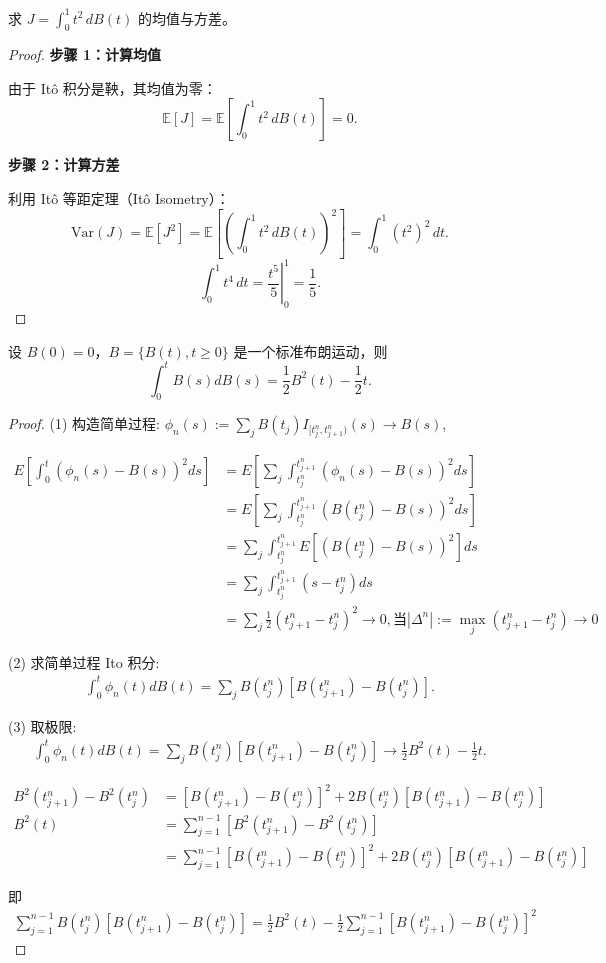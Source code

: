 \documentclass[lang=cn,10pt,thmcnt=section]{elegantbook}
\begin{document}
\begin{example}
	求 \( J = \int_{0}^{1} t^2 \, dB(t) \) 的均值与方差。
\end{example}
\begin{proof}
	\textbf{步骤 1：计算均值}  

由于 Itô 积分是鞅，其均值为零：
\[
\mathbb{E}[J] = \mathbb{E}\left[\int_{0}^{1} t^2 \, dB(t)\right] = 0.
\]

\textbf{步骤 2：计算方差}  

利用 Itô 等距定理（Itô Isometry）：
\[
\text{Var}(J) = \mathbb{E}[J^2] = \mathbb{E}\left[\left(\int_{0}^{1} t^2 \, dB(t)\right)^2\right] = \int_{0}^{1} (t^2)^2 \, dt.
\]
\[
\int_{0}^{1} t^4 \, dt = \left. \frac{t^5}{5} \right|_{0}^{1} = \frac{1}{5}.
\]
\end{proof}
\begin{example}
	设 \( B(0) = 0 \)，\( B = \{B(t), t \geq 0\} \) 是一个标准布朗运动，则
\[
\int_0^t B(s) dB(s) = \frac{1}{2} B^2(t) - \frac{1}{2} t.
\]
\end{example}
\begin{proof}
    (1) 构造简单过程: \(\phi_n(s) := \sum_j B(t_j) I_{[t_j^n, t_{j+1}^n)}(s) \rightarrow B(s)\),

    \begin{align*}
    E\left[\int_0^t (\phi_n(s) - B(s))^2 ds\right] &= E\left[\sum_j \int_{t_j^n}^{t_{j+1}^n} (\phi_n(s) - B(s))^2 ds\right] \\
    &= E\left[\sum_j \int_{t_j^n}^{t_{j+1}^n} (B(t_j^n) - B(s))^2 ds\right] \\
    &= \sum_j \int_{t_j^n}^{t_{j+1}^n} E[(B(t_j^n) - B(s))^2] ds \\
    &= \sum_j \int_{t_j^n}^{t_{j+1}^n} (s - t_j^n) ds \\
    &= \sum_j \frac{1}{2}(t_{j+1}^n - t_j^n)^2 \rightarrow 0, \text{当} |\Delta^n| := \max_j (t_{j+1}^n - t_j^n) \rightarrow 0
    \end{align*}

    (2) 求简单过程 Ito 积分:
    \begin{align*}
    \int_0^t \phi_n(t) dB(t) = \sum_j B(t_j^n) [B(t_{j+1}^n) - B(t_j^n)].
    \end{align*}

    (3) 取极限: 
    \begin{align*}
    \int_0^t \phi_n(t) dB(t) = \sum_j B(t_j^n) [B(t_{j+1}^n) - B(t_j^n)] \rightarrow \frac{1}{2} B^2(t) - \frac{1}{2} t.
    \end{align*}

    \begin{align*}
    B^2(t_{j+1}^n) - B^2(t_j^n) &= [B(t_{j+1}^n) - B(t_j^n)]^2 + 2B(t_j^n) [B(t_{j+1}^n) - B(t_j^n)] \\
    B^2(t) &= \sum_{j=1}^{n-1} [B^2(t_{j+1}^n) - B^2(t_j^n)] \\
    &= \sum_{j=1}^{n-1} [B(t_{j+1}^n) - B(t_j^n)]^2 + 2B(t_j^n) [B(t_{j+1}^n) - B(t_j^n)]
    \end{align*}

    即 
    \begin{align*}
    \sum_{j=1}^{n-1} B(t_j^n) [B(t_{j+1}^n) - B(t_j^n)] = \frac{1}{2} B^2(t) - \frac{1}{2} \sum_{j=1}^{n-1} [B(t_{j+1}^n) - B(t_j^n)]^2
    \end{align*}
\end{proof}
\end{document}
